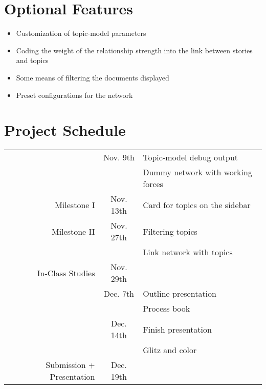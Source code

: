 \section{Optional Features}
\begin{itemize}
	\item Customization of topic-model parameters
	\item Coding the weight of the relationship strength into the link
		between stories and topics
	\item Some means of filtering the documents displayed
	\item Preset configurations for the network
\end{itemize}

\section{Project Schedule}

\begin{tabular}{|r|c|l|}
	\hline
	                          &  Nov. 9th & Topic-model debug output \\
														&           & Dummy network with working forces\\\hline
	              Milestone I & Nov. 13th & Card for topics on the sidebar \\\hline
							 Milestone II & Nov. 27th & Filtering topics \\
														&           & Link network with topics \\\hline
					 In-Class Studies & Nov. 29th & \\\hline
	                          &  Dec. 7th & Outline presentation \\
														&           & Process book \\\hline
	                          & Dec. 14th & Finish presentation \\
														&           & Glitz and color \\\hline
	Submission + Presentation & Dec. 19th & \\\hline
\end{tabular}


